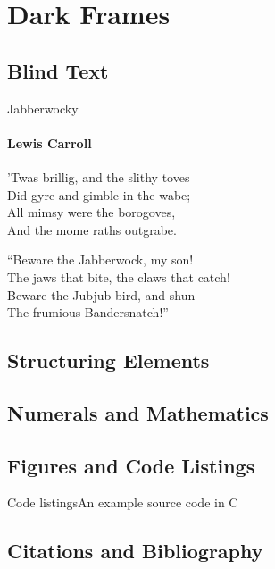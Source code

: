 \documentclass{beamer}
\begin{document}
\section{Dark Frames}
\begin{darkframes}
  \subsection{Blind Text}
  \begin{frame}{Jabberwocky}
    \framesubtitle{Lewis Carroll}%
    'Twas brillig, and the slithy toves\\
    Did gyre and gimble in the wabe;\\
    All mimsy were the borogoves,\\
    And the mome raths outgrabe.\\\bigskip

    “Beware the Jabberwock, my son!\\
    The jaws that bite, the claws that catch!\\
    Beware the Jubjub bird, and shun\\
    The frumious Bandersnatch!”\\
  \end{frame}
  \subsection{Structuring Elements}
  \subsection{Numerals and Mathematics}
  \subsection{Figures and Code Listings}
  \begin{frame}{Code listings}{An example source code in C}
    \sleepSort
  \end{frame}
  \subsection{Citations and Bibliography}
\end{darkframes}
\end{document}
